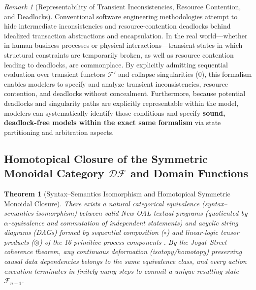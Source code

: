\documentclass[11pt,a4paper]{article}
\theoremstyle{definition}
\theoremstyle{plain}
\newtheorem{theorem}{Theorem}[section]
\theoremstyle{remark}
\newtheorem{remark}{Remark}[section]
\newcommand{\DF}{\mathcal{DF}}
\begin{document}
\begin{remark}[Representability of Transient Inconsistencies, Resource Contention, and Deadlocks]\label{rem:deadlocks}
Conventional software engineering methodologies attempt to hide intermediate inconsistencies and resource-contention deadlocks behind idealized transaction abstractions and encapsulation. In the real world---whether in human business processes or physical interactions---transient states in which structural constraints are temporarily broken, as well as resource contention leading to deadlocks, are commonplace. By explicitly admitting sequential evaluation over transient functors $\mathcal{F}'$ and collapse singularities ($0$), this formalism enables modelers to specify and analyze transient inconsistencies, resource contention, and deadlocks without concealment. Furthermore, because potential deadlocks and singularity paths are explicitly representable within the model, modelers can systematically identify those conditions and specify \textbf{sound, deadlock-free models within the exact same formalism} via state partitioning and arbitration aspects.
\end{remark}

\subsection{Homotopical Closure of the Symmetric Monoidal Category $\DF$ and Domain Functions}

\begin{theorem}[Syntax--Semantics Isomorphism and Homotopical Symmetric Monoidal Closure]\label{thm:monoidal-closure}
There exists a natural categorical equivalence (syntax--semantics isomorphism) between valid New OAL textual programs (quotiented by $\alpha$-equivalence and commutation of independent statements) and acyclic string diagrams (DAGs) formed by sequential composition ($\circ$) and linear-logic tensor products ($\otimes$) of the 16 primitive process components \cite{joyal1991,coecke2017}. By the Joyal--Street coherence theorem, any continuous deformation (isotopy/homotopy) preserving causal data dependencies belongs to the same equivalence class, and every action execution terminates in finitely many steps to commit a unique resulting state $\mathcal{F}_{n+1}$.
\end{theorem}
\end{document}
